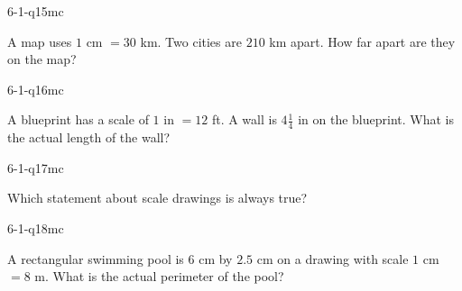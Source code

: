 \begin{practiceQuestion}{6-1-q15}{mc}
\begin{questionText}
A map uses $1$ cm $= 30$ km. Two cities are $210$ km apart. How far apart are they on the map?
\end{questionText}
\end{practiceQuestion}

\begin{practiceQuestion}{6-1-q16}{mc}
\begin{questionText}
A blueprint has a scale of $1$ in $= 12$ ft. A wall is $4\frac{1}{4}$ in on the blueprint. What is the actual length of the wall?
\end{questionText}
\end{practiceQuestion}

\begin{practiceQuestion}{6-1-q17}{mc}
\begin{questionText}
Which statement about scale drawings is always true?
\end{questionText}
\end{practiceQuestion}

\begin{practiceQuestion}{6-1-q18}{mc}
\begin{questionText}
A rectangular swimming pool is $6$ cm by $2.5$ cm on a drawing with scale $1$ cm $= 8$ m. What is the actual perimeter of the pool?
\end{questionText}
\end{practiceQuestion}

